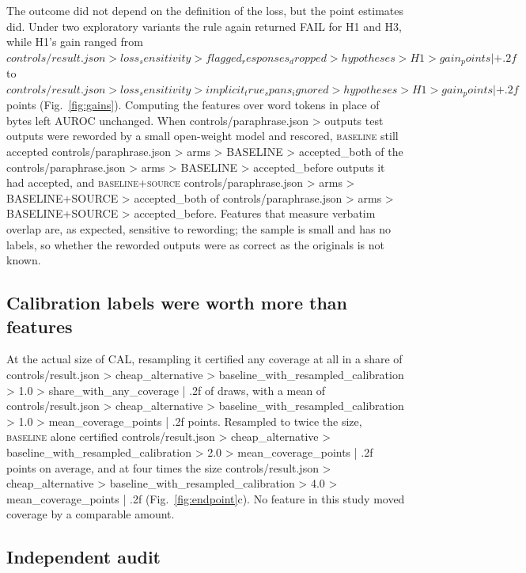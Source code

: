 \documentclass[11pt]{article}
\newcommand{\arm}[1]{\textsc{#1}}
\begin{document}
The outcome did not depend on the definition of the loss, but the point estimates did. Under two exploratory variants the rule again returned FAIL for H1 and H3, while H1's gain ranged from ${{controls/result.json > loss_sensitivity > flagged_responses_dropped > hypotheses > H1 > gain_points | +.2f}}$ to ${{controls/result.json > loss_sensitivity > implicit_true_spans_ignored > hypotheses > H1 > gain_points | +.2f}}$ points (Fig.~\ref{fig:gains}). Computing the features over word tokens in place of bytes left AUROC unchanged. When {{controls/paraphrase.json > outputs}} test outputs were reworded by a small open-weight model and rescored, \arm{baseline} still accepted {{controls/paraphrase.json > arms > BASELINE > accepted_both}} of the {{controls/paraphrase.json > arms > BASELINE > accepted_before}} outputs it had accepted, and \arm{baseline+source} {{controls/paraphrase.json > arms > BASELINE+SOURCE > accepted_both}} of {{controls/paraphrase.json > arms > BASELINE+SOURCE > accepted_before}}. Features that measure verbatim overlap are, as expected, sensitive to rewording; the sample is small and has no labels, so whether the reworded outputs were as correct as the originals is not known.

\subsection*{Calibration labels were worth more than features}

At the actual size of CAL, resampling it certified any coverage at all in a share of {{controls/result.json > cheap_alternative > baseline_with_resampled_calibration > 1.0 > share_with_any_coverage | .2f}} of draws, with a mean of {{controls/result.json > cheap_alternative > baseline_with_resampled_calibration > 1.0 > mean_coverage_points | .2f}} points. Resampled to twice the size, \arm{baseline} alone certified {{controls/result.json > cheap_alternative > baseline_with_resampled_calibration > 2.0 > mean_coverage_points | .2f}} points on average, and at four times the size {{controls/result.json > cheap_alternative > baseline_with_resampled_calibration > 4.0 > mean_coverage_points | .2f}} (Fig.~\ref{fig:endpoint}c). No feature in this study moved coverage by a comparable amount.

\subsection*{Independent audit}
\end{document}
